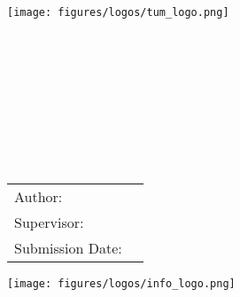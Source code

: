 \begin{titlepage}
    \makeatletter
    \begin{center}
        \texttt{[image: figures/logos/tum\_logo.png]}\\[0.5cm]
        \begin{Huge}
            \MakeUppercase{\getFaculty}
        \end{Huge}\\[0.5cm]
        \begin{large}
            \MakeUppercase{\getUniversity}
        \end{large}\\[2cm]
        \begin{Large}
            \getDoctype%
        \end{Large}\\[1.5cm]
        \begin{Huge}
            \@title\par
        \end{Huge}\\[1cm]
        \begin{Huge}
            \texttt{\getTitleGer{}}\par
        \end{Huge}\\[1.5cm]
        \begin{tabular}{l l}
            Author:          & \getAuthor{} \\
            Supervisor:      & \getSupervisor{} \\
            Submission Date: & \getSubmissionDate{} \\
        \end{tabular}
        \vfill
        \texttt{[image: figures/logos/info\_logo.png]}\\
    \end{center}
    \makeatother
\end{titlepage}
